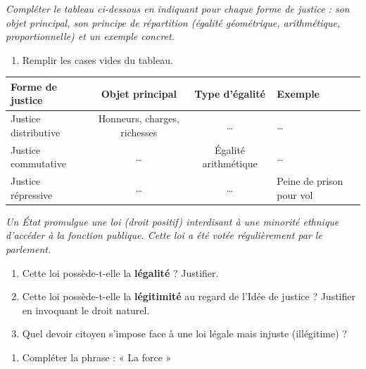 \documentclass[11pt]{article}
\begin{document}
\begin{exercice}
\emph{Compléter le tableau ci-dessous en indiquant pour chaque forme de justice : son objet principal, son principe de répartition (égalité géométrique, arithmétique, proportionnelle) et un exemple concret.}
\begin{enumerate}
    \item Remplir les cases vides du tableau.
\end{enumerate}
\begin{tabularx}{\linewidth}{|X|c|c|X|}
\hline
\textbf{Forme de justice} & \textbf{Objet principal} & \textbf{Type d'égalité} & \textbf{Exemple} \\
\hline
Justice distributive & Honneurs, charges, richesses & \ldots & \ldots \\
\hline
Justice commutative & \ldots & Égalité arithmétique & \ldots \\
\hline
Justice répressive & \ldots & \ldots & Peine de prison pour vol \\
\hline
\end{tabularx}
\end{exercice}

\begin{exercice}
\emph{Un État promulgue une loi (droit positif) interdisant à une minorité ethnique d'accéder à la fonction publique. Cette loi a été votée régulièrement par le parlement.}
\begin{enumerate}
    \item Cette loi possède-t-elle la \textbf{légalité} ? Justifier.
    \item Cette loi possède-t-elle la \textbf{légitimité} au regard de l'Idée de justice ? Justifier en invoquant le droit naturel.
    \item Quel devoir citoyen s'impose face à une loi légale mais injuste (illégitime) ?
\end{enumerate}
\end{exercice}

\begin{exercice}
\begin{enumerate}
    \item Compléter la phrase : « La force \makebox[4cm]{\dotfill} »
\end{enumerate}
\end{exercice}
\end{document}
